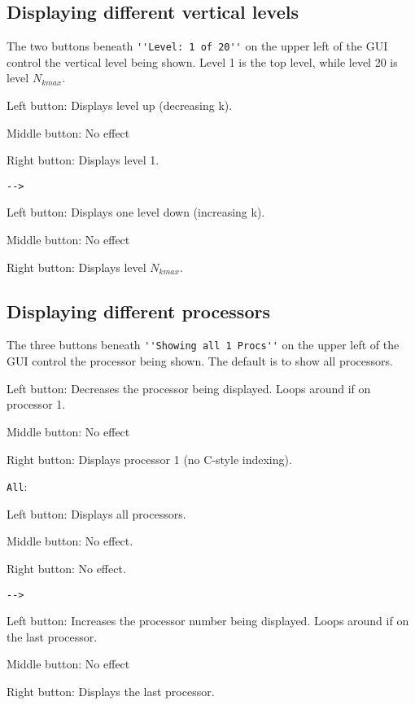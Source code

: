 \documentclass[12pt,oneside]{article}
\begin{document}
\subsection{Displaying different vertical levels}

The two buttons beneath \verb+''Level: 1 of 20''+ on the upper left of the GUI control the vertical level
being shown.  Level 1 is the top level, while level 20 is level $N_{kmax}$.
\begin{list}{}
\item \button{$<--$}
\begin{list}{}
\item Left button: Displays level up (decreasing k).
\item Middle button: No effect
\item Right button: Displays level 1.
\end{list}
\item \verb+-->+
\begin{list}{}
\item Left button: Displays one level down (increasing k).
\item Middle button: No effect
\item Right button: Displays level $N_{kmax}$.
\end{list}
\end{list}

\subsection{Displaying different processors}

The three buttons beneath \verb+''Showing all 1 Procs''+ on the upper left of the GUI control the processor
being shown.  The default is to show all processors.  
\begin{list}{}
\item \button{$<--$}
\begin{list}{}
\item Left button: Decreases the processor being displayed.  Loops around if on processor 1.
\item Middle button: No effect
\item Right button: Displays processor 1 (no C-style indexing).
\end{list}
\item \verb+All+: 
\begin{list}{}
\item Left button: Displays all processors.
\item Middle button: No effect.
\item Right button: No effect.
\end{list}
\item \verb+-->+
\begin{list}{}
\item Left button: Increases the processor number being displayed.  Loops around if on the last processor.
\item Middle button: No effect
\item Right button: Displays the last processor.
\end{list}
\end{list}
\end{document}
